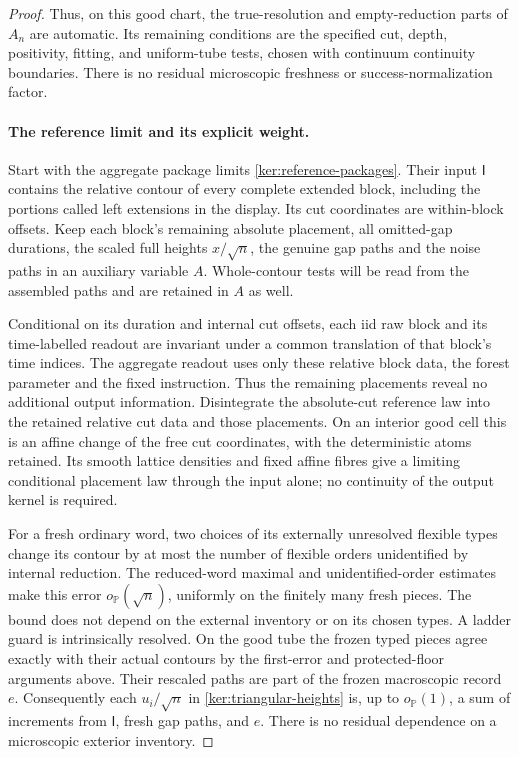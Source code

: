 \documentclass[11pt]{article}
\numberwithin{equation}{section}
\theoremstyle{definition}
\theoremstyle{remark}
\newcommand{\PP}{\mathbb P}
\newcommand{\1}{\mathbf 1}
\begin{document}
\begin{proof}
Thus, on this good chart, the true-resolution and empty-reduction
parts of \(A_n\) are automatic.  Its remaining conditions are the
specified cut, depth, positivity, fitting, and uniform-tube tests,
chosen with continuum continuity boundaries.  There is no residual
microscopic freshness or success-normalization factor.

\paragraph{The reference limit and its explicit weight.}
Start with the aggregate package limits
\eqref{ker:reference-packages}. Their input \(\mathsf I\) contains the
relative contour of every complete extended block, including the
portions called left extensions in the display. Its cut coordinates
are within-block offsets. Keep each block's remaining absolute
placement, all omitted-gap durations, the scaled full heights
\(x/\sqrt n\), the genuine gap paths and the noise paths in an
auxiliary variable \(A\). Whole-contour tests will be read from the
assembled paths and are retained in \(A\) as well.

Conditional on its duration and internal cut offsets, each iid raw
block and its time-labelled readout are invariant under a common
translation of that block's time indices. The aggregate readout uses
only these relative block data, the forest parameter and the fixed
instruction. Thus the remaining placements reveal no additional
output information. Disintegrate the absolute-cut reference law into
the retained relative cut data and those placements. On an interior
good cell this is an affine change of the free cut coordinates, with
the deterministic atoms retained. Its smooth lattice densities and
fixed affine fibres give a limiting conditional placement law through
the input alone; no continuity of the output kernel is required.

For a fresh ordinary word, two choices of its externally unresolved
flexible types change its contour by at most the number of flexible
orders unidentified by internal reduction. The reduced-word maximal
and unidentified-order estimates
\cite[Lemma~3.13]{SheffieldInventory}
\cite[Lemma~3.7]{GwynneMaoSunFKI} make this error
\(o_{\PP}(\sqrt n)\), uniformly on the finitely many fresh pieces.
The bound does not depend on the external inventory or on its chosen
types. A ladder guard is intrinsically resolved. On the good tube the
frozen typed pieces agree exactly with their actual contours by the
first-error and protected-floor arguments above. Their rescaled paths
are part of the frozen macroscopic record \(e\).
Consequently each \(u_i/\sqrt n\) in
\eqref{ker:triangular-heights} is, up to \(o_{\PP}(1)\), a sum of
increments from \(\mathsf I\), fresh gap paths, and \(e\).
There is no residual dependence on a microscopic exterior inventory.


\end{proof}
\end{document}
